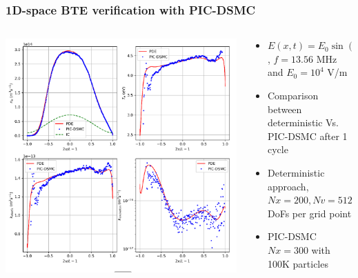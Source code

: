 \documentclass[mathserif, aspectratio=169]{beamer}
\begin{document}
\begin{frame}
	\frametitle{1D-space BTE verification with PIC-DSMC}
	\begin{columns}
	\begin{column}{0.4\textwidth}
		\includegraphics[width=1.1\textwidth]{1d_bte_pde_pic_dsmc.png}
	\end{column}
	\begin{column}{0.4\textwidth}
		\begin{itemize}
			\item $E(x, t) = E_0 \sin(2\pi f t)$, $f=13.56$ MHz and $E_0=10^4$ V/m
			\item Comparison between deterministic Vs. PIC-DSMC after 1 cycle
			\item Deterministic approach, $Nx=200, Nv=512 \times 6$ DoFs per grid point
			\item PIC-DSMC $Nx=300$ with 100K particles
		\end{itemize}
	\end{column}
\end{columns}
\end{frame}
\end{document}
